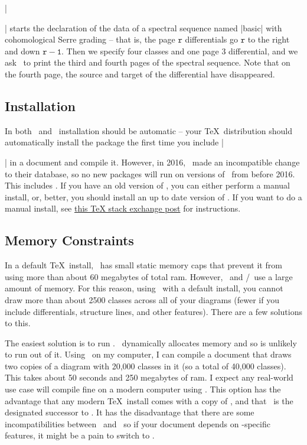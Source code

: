 \codeverb|\begin{sseqdata}[name = basic, cohomological Serre grading]| starts
the declaration of the data of a spectral sequence named |basic| with
cohomological Serre grading -- that is, the page $\mathtt{r}$ differentials go
$\mathtt{r}$ to the right and down $\mathtt{r-1}$. Then we specify four classes
and one page 3 differential, and we ask \sseqpages\  to print the third and
fourth pages of the spectral sequence. Note that on the fourth page, the source
and target of the differential have disappeared.

\subsection{Installation}
In both \miktex\ and \texlive\ installation should be automatic -- your \TeX\
distribution should automatically install the package the first time you include
|\usepackage{spectralsequences}| in a document and compile it. However, in 2016,
\texlive\ made an incompatible change to their database, so no new packages will
run on versions of \texlive\ from before 2016. This includes \sseqpages. If you
have an old version of \texlive, you can either perform a manual install, or,
better, you should install an up to date version of \texlive. If you want to do
a manual install, see \href{https://tex.stackexchange.com/a/73017}{this \TeX
stack exchange post} for instructions.

\subsection{Memory Constraints}
In a default \TeX\ install, \pdfLaTeX\ has small static memory caps that prevent
it from using more than about 60 megabytes of total ram. However,
\spectralsequences\ and \pgfpkg/\tikzpkg\ use a large amount of memory. For this
reason, using \pdfLaTeX\ with a default install, you cannot draw more than about
2500 classes across all of your diagrams (fewer if you include differentials,
structure lines, and other features). There are a few solutions to this.

The easiest solution is to run \LuaLaTeX. \LuaLaTeX\ dynamically allocates
memory and so is unlikely to run out of it. Using \LuaLaTeX\ on my computer, I
can compile a document that draws two copies of a diagram with 20,000 classes in
it (so a total of 40,000 classes). This takes about 50 seconds and 250 megabytes
of ram. I expect any real-world use case will compile fine on a modern computer
using \LuaLaTeX. This option has the advantage that any modern \TeX\ install
comes with a copy of \LuaLaTeX, and that \LuaLaTeX\ is the designated successor
to \pdfLaTeX. It has the disadvantage that there are some incompatibilities
between \LuaLaTeX\ and \pdfLaTeX\ so if your document depends on
\pdfLaTeX-specific features, it might be a pain to switch to \LuaLaTeX.


\end{sseqdata}
